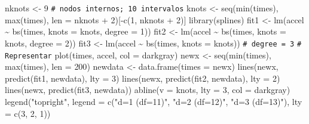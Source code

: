 \documentclass[
]{book}
\newenvironment{Shaded}{\begin{snugshade}}{\end{snugshade}}
\newcommand{\AttributeTok}[1]{\textcolor[rgb]{0.77,0.63,0.00}{#1}}
\newcommand{\CommentTok}[1]{\textcolor[rgb]{0.56,0.35,0.01}{\textit{#1}}}
\newcommand{\DecValTok}[1]{\textcolor[rgb]{0.00,0.00,0.81}{#1}}
\newcommand{\FunctionTok}[1]{\textcolor[rgb]{0.00,0.00,0.00}{#1}}
\newcommand{\NormalTok}[1]{#1}
\newcommand{\OtherTok}[1]{\textcolor[rgb]{0.56,0.35,0.01}{#1}}
\newcommand{\SpecialCharTok}[1]{\textcolor[rgb]{0.00,0.00,0.00}{#1}}
\newcommand{\StringTok}[1]{\textcolor[rgb]{0.31,0.60,0.02}{#1}}
\theoremstyle{break}
\theoremstyle{nonumberplain}
\renewcommand{\CommentTok}[1]{\textcolor[rgb]{0.41,0.41,0.41}{\texttt{#1}}}
\begin{document}
\begin{Shaded}
\begin{Highlighting}[]
\NormalTok{nknots }\OtherTok{\textless{}{-}} \DecValTok{9} \CommentTok{\# nodos internos; 10 intervalos}
\NormalTok{knots }\OtherTok{\textless{}{-}} \FunctionTok{seq}\NormalTok{(}\FunctionTok{min}\NormalTok{(times), }\FunctionTok{max}\NormalTok{(times), }\AttributeTok{len =}\NormalTok{ nknots }\SpecialCharTok{+} \DecValTok{2}\NormalTok{)[}\SpecialCharTok{{-}}\FunctionTok{c}\NormalTok{(}\DecValTok{1}\NormalTok{, nknots }\SpecialCharTok{+} \DecValTok{2}\NormalTok{)]}
\FunctionTok{library}\NormalTok{(splines)}
\NormalTok{fit1 }\OtherTok{\textless{}{-}} \FunctionTok{lm}\NormalTok{(accel }\SpecialCharTok{\textasciitilde{}} \FunctionTok{bs}\NormalTok{(times, }\AttributeTok{knots =}\NormalTok{ knots, }\AttributeTok{degree =} \DecValTok{1}\NormalTok{))}
\NormalTok{fit2 }\OtherTok{\textless{}{-}} \FunctionTok{lm}\NormalTok{(accel }\SpecialCharTok{\textasciitilde{}} \FunctionTok{bs}\NormalTok{(times, }\AttributeTok{knots =}\NormalTok{ knots, }\AttributeTok{degree =} \DecValTok{2}\NormalTok{))}
\NormalTok{fit3 }\OtherTok{\textless{}{-}} \FunctionTok{lm}\NormalTok{(accel }\SpecialCharTok{\textasciitilde{}} \FunctionTok{bs}\NormalTok{(times, }\AttributeTok{knots =}\NormalTok{ knots)) }\CommentTok{\# degree = 3}
\CommentTok{\# Representar}
\FunctionTok{plot}\NormalTok{(times, accel, }\AttributeTok{col =} \StringTok{\textquotesingle{}darkgray\textquotesingle{}}\NormalTok{)}
\NormalTok{newx }\OtherTok{\textless{}{-}} \FunctionTok{seq}\NormalTok{(}\FunctionTok{min}\NormalTok{(times), }\FunctionTok{max}\NormalTok{(times), }\AttributeTok{len =} \DecValTok{200}\NormalTok{)}
\NormalTok{newdata }\OtherTok{\textless{}{-}} \FunctionTok{data.frame}\NormalTok{(}\AttributeTok{times =}\NormalTok{ newx)}
\FunctionTok{lines}\NormalTok{(newx, }\FunctionTok{predict}\NormalTok{(fit1, newdata), }\AttributeTok{lty =} \DecValTok{3}\NormalTok{)}
\FunctionTok{lines}\NormalTok{(newx, }\FunctionTok{predict}\NormalTok{(fit2, newdata), }\AttributeTok{lty =} \DecValTok{2}\NormalTok{)}
\FunctionTok{lines}\NormalTok{(newx, }\FunctionTok{predict}\NormalTok{(fit3, newdata))}
\FunctionTok{abline}\NormalTok{(}\AttributeTok{v =}\NormalTok{ knots, }\AttributeTok{lty =} \DecValTok{3}\NormalTok{, }\AttributeTok{col =} \StringTok{\textquotesingle{}darkgray\textquotesingle{}}\NormalTok{)}
\FunctionTok{legend}\NormalTok{(}\StringTok{"topright"}\NormalTok{, }\AttributeTok{legend =} \FunctionTok{c}\NormalTok{(}\StringTok{"d=1 (df=11)"}\NormalTok{, }\StringTok{"d=2 (df=12)"}\NormalTok{, }\StringTok{"d=3 (df=13)"}\NormalTok{), }
       \AttributeTok{lty =} \FunctionTok{c}\NormalTok{(}\DecValTok{3}\NormalTok{, }\DecValTok{2}\NormalTok{, }\DecValTok{1}\NormalTok{))}
\end{Highlighting}
\end{Shaded}
\end{document}
